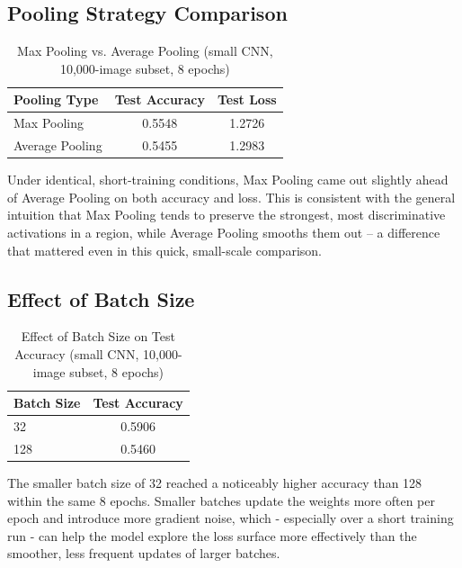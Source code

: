 \documentclass[11pt]{article}
\begin{document}
\subsection*{Pooling Strategy Comparison}

\begin{table}[H]
\centering
\caption{Max Pooling vs. Average Pooling (small CNN, 10,000-image subset, 8 epochs)}
\begin{tabular}{lcc}
\toprule
Pooling Type & Test Accuracy & Test Loss \\
\midrule
Max Pooling & 0.5548 & 1.2726 \\
Average Pooling & 0.5455 & 1.2983 \\
\bottomrule
\end{tabular}
\end{table}

Under identical, short-training conditions, Max Pooling came out slightly ahead of Average Pooling on both accuracy and loss. This is consistent with the general intuition that Max Pooling tends to preserve the strongest, most discriminative activations in a region, while Average Pooling smooths them out -- a difference that mattered even in this quick, small-scale comparison.

\subsection*{Effect of Batch Size}

\begin{table}[H]
\centering
\caption{Effect of Batch Size on Test Accuracy (small CNN, 10,000-image subset, 8 epochs)}
\begin{tabular}{lc}
\toprule
Batch Size & Test Accuracy \\
\midrule
32  & 0.5906 \\
128 & 0.5460 \\
\bottomrule
\end{tabular}
\end{table}

The smaller batch size of 32 reached a noticeably higher accuracy than 128 within the same 8 epochs. Smaller batches update the weights more often per epoch and introduce more gradient noise, which - especially over a short training run - can help the model explore the loss surface more effectively than the smoother, less frequent updates of larger batches.

\end{document}
